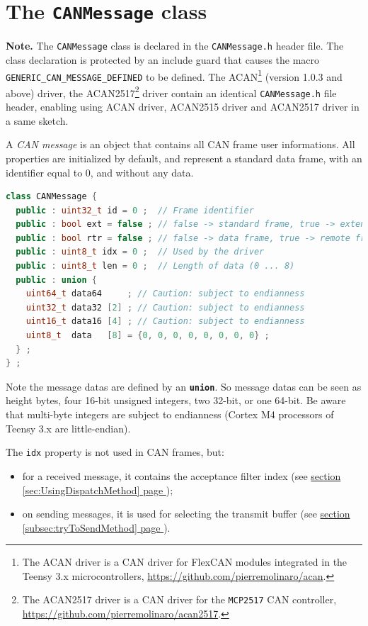 \documentclass[10pt, a4paper, obeyspaces, openany]{extarticle}
\newcommand \sectionLabel[2]{\section{#1}\label{sec:#2}}
\newcommand\refSectionPage[1]{\hyperref[sec:#1]{section \ref*{sec:#1} page \pageref{sec:#1}}}
\newcommand\refSubsectionPage[1]{\hyperref[subsec:#1]{section \ref*{subsec:#1} page \pageref{subsec:#1}}}
\begin{document}
\sectionLabel{The \texttt{CANMessage} class}{CANMessageClass}

{\bf Note. } The \texttt{CANMessage} class is declared in the \texttt{CANMessage.h} header file. The class declaration is protected by an include guard that causes the macro \texttt{GENERIC\_CAN\_MESSAGE\_DEFINED} to be defined. The ACAN\footnote{The ACAN driver is a CAN driver for FlexCAN modules integrated in the Teensy 3.x microcontrollers, \url{https://github.com/pierremolinaro/acan}.} (version 1.0.3 and above) driver, the ACAN2517\footnote{The ACAN2517 driver is a CAN driver for the \texttt{MCP2517} CAN controller, \url{https://github.com/pierremolinaro/acan2517}.} driver contain an identical \texttt{CANMessage.h} file header, enabling using ACAN driver, ACAN2515 driver and ACAN2517 driver in a same sketch.

A \emph{CAN message} is an object that contains all CAN frame user informations. All properties are initialized by default, and represent a standard data frame, with an identifier equal to $0$, and without any data.

{ \small\begin{lstlisting}[language=c++]
class CANMessage {
  public : uint32_t id = 0 ;  // Frame identifier
  public : bool ext = false ; // false -> standard frame, true -> extended frame
  public : bool rtr = false ; // false -> data frame, true -> remote frame
  public : uint8_t idx = 0 ;  // Used by the driver
  public : uint8_t len = 0 ;  // Length of data (0 ... 8)
  public : union {
    uint64_t data64     ; // Caution: subject to endianness
    uint32_t data32 [2] ; // Caution: subject to endianness
    uint16_t data16 [4] ; // Caution: subject to endianness
    uint8_t  data   [8] = {0, 0, 0, 0, 0, 0, 0, 0} ;
  } ;
} ;
\end{lstlisting}}

Note the message datas are defined by an {\bf\texttt{union}}. So message datas can be seen as height bytes, four 16-bit unsigned integers, two 32-bit, or one 64-bit. Be aware that multi-byte integers are subject to endianness (Cortex M4 processors of Teensy 3.x are little-endian).

The \texttt{idx} property is not used in CAN frames, but:
\begin{itemize}
  \item for a received message, it contains the acceptance filter index (see \refSectionPage{UsingDispatchMethod});
  \item on sending messages, it is used for selecting the transmit buffer (see \refSubsectionPage{tryToSendMethod}).
\end{itemize}
\end{document}
